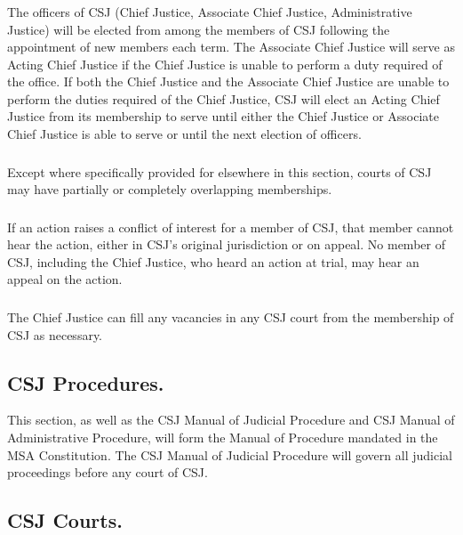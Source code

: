 \subsubsection{}
The officers of CSJ (Chief Justice, Associate Chief Justice, Administrative Justice) will be elected from among the members of CSJ following the appointment of new members each term.  The Associate Chief Justice will serve as Acting Chief Justice if the Chief Justice is unable to perform a duty required of the office.  If both the Chief Justice and the Associate Chief Justice are unable to perform the duties required of the Chief Justice, CSJ will elect an Acting Chief Justice from its membership to serve until either the Chief Justice or Associate Chief Justice is able to serve or until the next election of officers.
\subsubsection{}
Except where specifically provided for elsewhere in this section, courts of CSJ may have partially or completely overlapping memberships.
\subsubsection{}
If an action raises a conflict of interest for a member of CSJ, that member cannot hear the action, either in CSJ's original jurisdiction or on appeal.  No member of CSJ, including the Chief Justice, who heard an action at trial, may hear an appeal on the action.
\subsubsection{}
The Chief Justice can fill any vacancies in any CSJ court from the membership of CSJ as necessary.

\subsection{CSJ Procedures.}
This section, as well as the CSJ Manual of Judicial Procedure and CSJ Manual of Administrative Procedure, will form the Manual of Procedure mandated in the MSA Constitution.  The CSJ Manual of Judicial Procedure will govern all judicial proceedings before any court of CSJ.

\subsection{CSJ Courts.}

